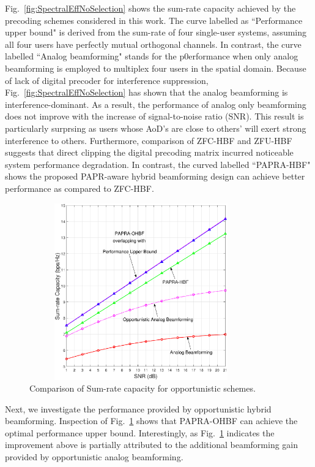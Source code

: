 \documentclass[conference]{IEEEtran}
\begin{document}
Fig.~\ref{fig:SpectralEffNoSelection} shows the sum-rate capacity achieved by the precoding schemes considered in this work. The curve labelled as ``Performance upper bound" is derived from the sum-rate of four single-user systems, assuming all four users have perfectly mutual orthogonal channels. In contrast, the curve labelled ``Analog beamforming" stands for the p0erformance when only analog beamforming is employed to multiplex four users in the spatial domain. Because of lack of digital precoder for interference suppression, Fig.~\ref{fig:SpectralEffNoSelection} has shown that the analog beamforming is interference-dominant. As a result, the performance of analog only beamforming does not improve with the increase of signal-to-noise ratio (SNR). This result is particularly surprsing as users whose AoD's are close to others' will exert strong interference to others. Furthermore, comparison of ZFC-HBF and ZFU-HBF suggests that direct clipping the digital precoding matrix incurred noticeable system performance degradation. In contrast, the curved labelled ``PAPRA-HBF" shows the proposed PAPR-aware hybrid beamforming design can achieve better performance as compared to ZFC-HBF.

\begin{figure}[ht]
 	\begin{center}
 	\includegraphics[width=3.8in,height=3in]{Figure/SpectralEffWithSelection2.eps}
 	\caption{Comparison of Sum-rate capacity for opportunistic schemes.}\label{fig:SpectralEffWithSelection}
    \end{center}
\end{figure}

Next, we investigate the performance provided by opportunistic hybrid beamforming. Inspection of Fig.~\ref{fig:SpectralEffWithSelection} shows that PAPRA-OHBF can achieve the optimal performance upper bound. Interestingly, as Fig.~\ref{fig:SpectralEffWithSelection} indicates the improvement above is partially attributed to the additional beamforming gain provided by opportunistic analog beamforming.
\end{document}
